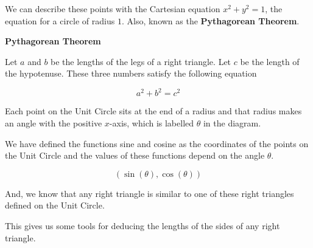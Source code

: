 \documentclass{ximera}
\begin{document}
We can describe these points with the Cartesian equation $x^2 + y^2 = 1$, the equation for a circle of radius $1$. Also, known as the \textbf{Pythagorean Theorem}.



\begin{theorem}   \textbf{\textcolor{-red!75!green}{Pythagorean Theorem}} 

Let $a$ and $b$ be the lengths of the legs of a right triangle. Let $c$ be the length of the hypotenuse. These three numbers satisfy the following equation

\[
a^2 + b^2 = c^2
\]

\end{theorem}




Each point on the Unit Circle sits at the end of a radius and that radius makes an angle with the positive $x$-axis, which is labelled $\theta$ in the diagram.




We have defined the functions sine and cosine as the coordinates of the points on the Unit Circle and the values of these functions depend on the angle $\theta$.

\[    ( \sin(\theta), \cos(\theta) ) \]




And, we know that any right triangle is similar to one of these right triangles defined on the Unit Circle.


This gives us some tools for deducing the lengths of the sides of any right triangle.
\end{document}
